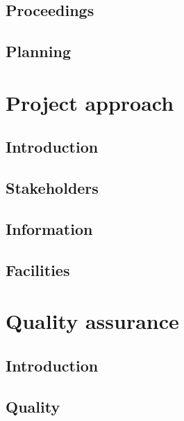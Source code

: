 \documentclass[]{article}
\begin{document}
\subsection{Proceedings}
\subsection{Planning}
\section{Project approach}
\subsection{Introduction}
\subsection{Stakeholders}
\subsection{Information}
\subsection{Facilities}
\section{Quality assurance}
\subsection{Introduction}
\subsection{Quality}
\end{document}

